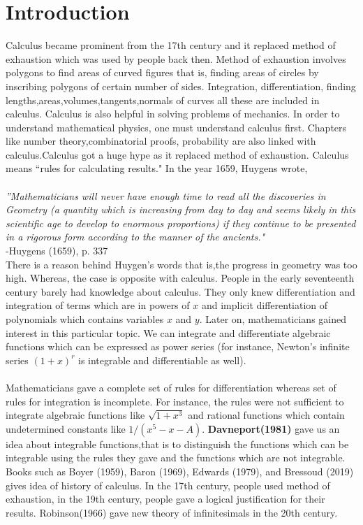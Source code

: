 \documentclass[a4paper,reqno,11pt]{amsart}
\theoremstyle{plain}%
\begin{document}
\section{Introduction}
Calculus became prominent from the 17th century and it replaced method of exhaustion which was used by people back then. Method of exhaustion involves polygons to find areas of curved figures that is, finding areas of circles by inscribing polygons of certain number of sides. Integration, differentiation, finding lengths,areas,volumes,tangents,normals of curves all these are included in calculus. Calculus is also helpful in solving problems of mechanics. In order to understand mathematical physics, one must understand calculus first. Chapters like number theory,combinatorial proofs, probability are also linked with calculus.Calculus got a huge hype as it replaced method of exhaustion. Calculus means ``rules for calculating results." In the year 1659, Huygens wrote,\\
\\
\textit{''Mathematicians will never have enough time to read all the
discoveries in Geometry (a quantity which is increasing from
day to day and seems likely in this scientific age to develop
to enormous proportions) if they continue to be presented in a
rigorous form according to the manner of the ancients."}\cite{ref 1}\\
\vspace{2ex}
\hfill{-Huygens (1659), p. 337}
\\
\indent There is a reason behind Huygen's words that is,the progress in geometry was too high. Whereas, the case is opposite with calculus. People in the early seventeenth century barely had knowledge about calculus. They only knew differentiation and integration of terms which are in powers of $x$ and implicit differentiation of polynomials which contains variables $x$
and $y$. Later on, mathematicians gained interest in this particular topic. We can integrate and differentiate algebraic functions which can be expressed as power series (for instance, Newton's infinite series $(1+x)^r$ is integrable and differentiable as well).\\
\\
\indent Mathematicians gave a complete set of rules for differentiation whereas set of rules for integration is incomplete. For instance, the rules were not sufficient to integrate algebraic functions like 
$\sqrt{1+x^3}$ and rational functions which contain undetermined constants
like $1/(x^5-x-A)$. \textbf{Davneport(1981)} gave us an idea about integrable functions,that is to distinguish the functions which can be integrable using the rules they gave and the functions which are not integrable. 
Books such as Boyer (1959), Baron (1969), Edwards (1979), and Bressoud
(2019) gives idea of history of calculus. In the 17th century, people used method of exhaustion, in the 19th century, people gave a logical justification for their results. Robinson(1966) gave new theory of infinitesimals in the 20th century.\\
\\
\end{document}
